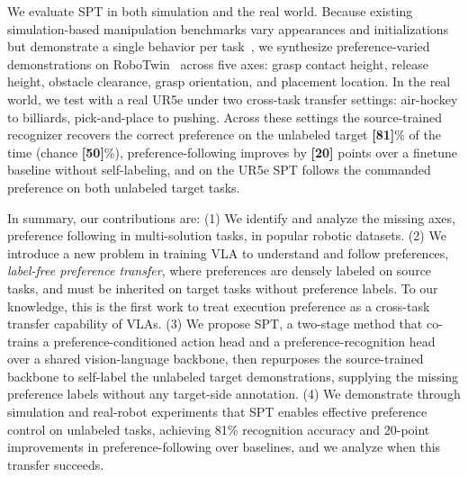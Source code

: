 \documentclass{article}
\begin{document}

We evaluate SPT in both simulation and the real world. Because existing simulation-based manipulation benchmarks vary appearances and initializations but demonstrate a single behavior per task~\citep{libero, liberoplus}, we synthesize preference-varied demonstrations on RoboTwin~\citep{robotwin} across five axes: grasp contact height, release height, obstacle clearance, grasp orientation, and placement location. In the real world, we test with a real UR5e under two cross-task transfer settings: air-hockey to billiards, pick-and-place to pushing.
Across these settings the source-trained recognizer recovers the correct preference on the unlabeled target \textbf{[81]}\% of the time (chance \textbf{[50]}\%), preference-following improves by \textbf{[20]} points over a finetune baseline without self-labeling, and on the UR5e SPT follows the commanded preference on both unlabeled target tasks.

In summary, our contributions are: 
(1) We identify and analyze the missing axes, preference following in multi-solution tasks, in popular robotic datasets.
(2) We introduce a new problem in training VLA to understand and follow preferences, \emph{label-free preference transfer}, where preferences are densely labeled on source tasks, and must be inherited on target tasks without preference labels. To our knowledge, this is the first work to treat execution preference as a cross-task transfer capability of VLAs. (3) We propose SPT, a two-stage method that co-trains a preference-conditioned action head and a preference-recognition head over a shared vision-language backbone, then repurposes the source-trained backbone to self-label the unlabeled target demonstrations, supplying the missing preference labels without any target-side annotation.
(4) We demonstrate through simulation and real-robot experiments that SPT enables effective preference control on unlabeled tasks, achieving 81\% recognition accuracy and 20-point improvements in preference-following over baselines, and we analyze when this transfer succeeds.

 


\end{document}
